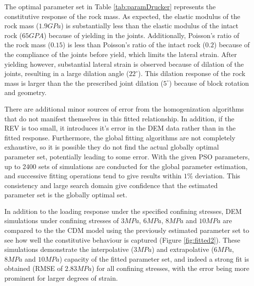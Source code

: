 The optimal parameter set in Table \ref{tab:paramDrucker} represents the constitutive response of the rock mass. As expected, the elastic modulus of the rock mass ($1.9 GPa$) is substantially less than the elastic modulus of the intact rock ($65 GPA$) because of yielding in the joints. Additionally, Poisson's ratio of the rock mass ($0.15$) is less than Poisson's ratio of the intact rock ($0.2$) because of the compliance of the joints before yield, which limits the lateral strain. After yielding however, substantial lateral strain is observed because of dilation of the joints, resulting in a large dilation angle ($22^\circ$). This dilation response of the rock mass is larger than the the prescribed joint dilation ($5^\circ$) because of block rotation and geometry.

There are additional minor sources of error from the homogenization algorithms that do not manifest themselves in this fitted relationship.  In addition, if the REV is too small, it introduces it's error in the DEM data rather than in the fitted response. Furthermore, the global fitting algorithms are not completely exhaustive, so it is possible they do not find the actual globally optimal parameter set, potentially leading to some error. With the given PSO parameters, up to 2400 sets of simulations are conducted for the global parameter estimation, and successive fitting operations tend to give results within $1\%$ deviation. This consistency and large search domain give confidence that the estimated parameter set is the globally optimal set. 

In addition to the loading response under the specified confining stresses, DEM simulations under confining stresses of $3MPa$, $6MPa$, $8MPa$ and $10MPa$ are compared to the the CDM model using the previously estimated parameter set to see how well the constitutive behaviour is captured (Figure \ref{fig:fitted2}). These simulations demonstrate the interpolative ($3MPa$) and extrapolative ($6MPa$, $8MPa$ and $10MPa$) capacity of the fitted parameter set, and indeed a strong fit is obtained (RMSE of $2.83MPa$) for all confining stresses, with the error being more prominent for larger degrees of strain.

